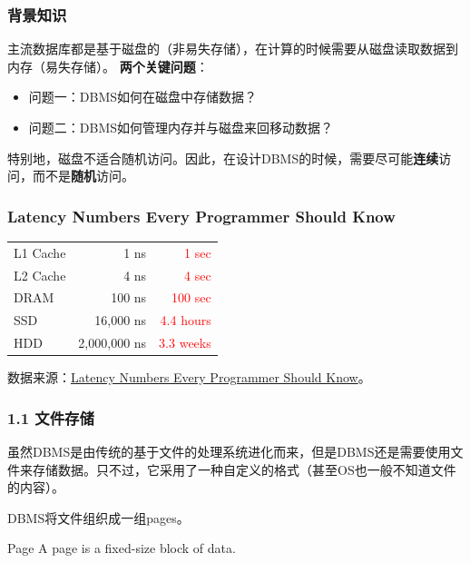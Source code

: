 \documentclass[aspectratio=169, 14pt]{beamer}
\begin{document}
\begin{frame}
    \frametitle{背景知识}
主流数据库都是基于\alert{磁盘的}（非易失存储），在计算的时候需要从磁盘读取数据到\alert{内存}（易失存储）。
\noindent\makebox[\linewidth]{\rule{\paperwidth}{0.4pt}}
\textbf{ 两个关键问题}：

\begin{itemize}
    \item 问题一：DBMS如何在磁盘中存储数据？
    \item 问题二：DBMS如何管理内存并与磁盘来回移动数据？
\end{itemize}

特别地，磁盘不适合随机访问。因此，在设计DBMS的时候，需要尽可能\textbf{连续}访问，而不是\textbf{随机}访问。
\end{frame}

\begin{frame}
    \frametitle{Latency Numbers Every Programmer Should Know}

    \begin{table}
        \begin{tabular}{lrr}
          \toprule
          L1 Cache & 1 ns & \textcolor{red}{1 sec} \\
          L2 Cache & 4 ns & \textcolor{red}{4 sec} \\
          DRAM & 100 ns & \textcolor{red}{100 sec} \\
          SSD & 16,000 ns & \textcolor{red}{4.4 hours} \\
          HDD & 2,000,000 ns & \textcolor{red}{3.3 weeks} \\
          \bottomrule
        \end{tabular}
    \end{table}
    数据来源：\href{https://colin-scott.github.io/personal_website/research/interactive_latency.html}{Latency Numbers Every Programmer Should Know}。
\end{frame}

\begin{frame}
    \frametitle{1.1 文件存储}
虽然DBMS是由传统的\alert{基于文件的处理系统}进化而来，但是DBMS还是需要使用文件来存储数据。只不过，它采用了一种自定义的格式（甚至OS也一般不知道文件的内容）。

DBMS将文件组织成一组\alert{pages}。

\begin{exampleblock}{Page}
A page is a fixed-size block of data.    
\end{exampleblock}

\end{frame}
\end{document}
